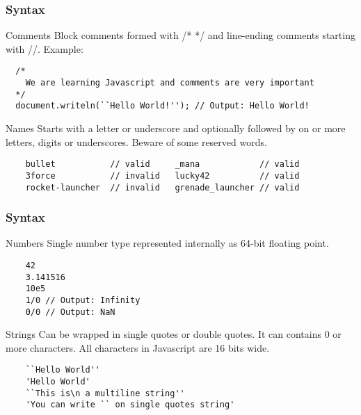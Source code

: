 \begin{frame}[fragile]
  \frametitle{Syntax}

  \begin{block}{Comments}
  Block comments formed with /* */ and line-ending comments starting with //. Example:
  {\scriptsize
  \begin{verbatim}
  /* 
    We are learning Javascript and comments are very important
  */
  document.writeln(``Hello World!''); // Output: Hello World!
  \end{verbatim}
  }
  \end{block}

  \pause
  
  \begin{block}{Names}
    Starts with a letter or underscore and optionally followed by on or more letters, digits or underscores. Beware of some reserved words.
    {\scriptsize
    \begin{verbatim}
    bullet           // valid     _mana            // valid
    3force 	         // invalid   lucky42          // valid
    rocket-launcher  // invalid   grenade_launcher // valid
    \end{verbatim}
    }
  \end{block}
\end{frame}

\begin{frame}[fragile]
  \frametitle{Syntax}

  \begin{block}{Numbers}
    Single number type represented internally as 64-bit floating point.
    {\scriptsize
    \begin{verbatim}
    42 
    3.141516
    10e5
    1/0 // Output: Infinity
    0/0 // Output: NaN
    \end{verbatim}
    }
  \end{block}

  \pause

  \begin{block}{Strings}
    Can be wrapped in single quotes or double quotes. It can contains 0 or more characters. All characters in Javascript are 16 bits wide.
    {\scriptsize
    \begin{verbatim}
    ``Hello World''
    'Hello World'
    ``This is\n a multiline string''
    'You can write `` on single quotes string'
    \end{verbatim}
    }
  \end{block}
\end{frame}

